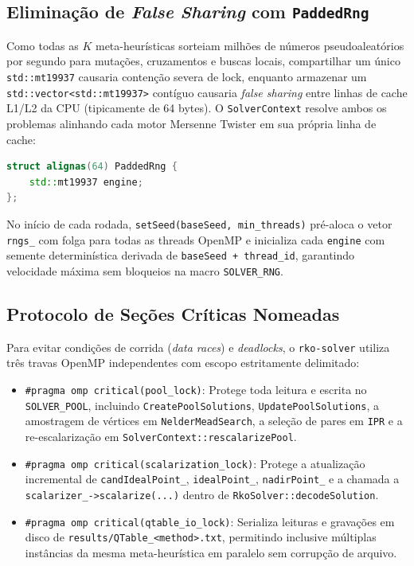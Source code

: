\documentclass[11pt,a4paper]{article}
\begin{document}
\subsection{Eliminação de \emph{False Sharing} com \texttt{PaddedRng}}

Como todas as $K$ meta-heurísticas sorteiam milhões de números pseudoaleatórios por segundo para mutações, cruzamentos e buscas locais, compartilhar um único \texttt{std::mt19937} causaria contenção severa de lock, enquanto armazenar um \texttt{std::vector<std::mt19937>} contíguo causaria \emph{false sharing} entre linhas de cache L1/L2 da CPU (tipicamente de 64 bytes). O \texttt{SolverContext} resolve ambos os problemas alinhando cada motor Mersenne Twister em sua própria linha de cache:
\begin{lstlisting}[language=C++, caption={Gerador isolado e alinhado em linha de cache de 64 bytes (\texttt{context.hpp}).}]
struct alignas(64) PaddedRng {
    std::mt19937 engine;
};
\end{lstlisting}
No início de cada rodada, \texttt{setSeed(baseSeed, min\_threads)} pré-aloca o vetor \texttt{rngs\_} com folga para todas as threads OpenMP e inicializa cada \texttt{engine} com semente determinística derivada de \texttt{baseSeed + thread\_id}, garantindo velocidade máxima sem bloqueios na macro \texttt{SOLVER\_RNG}.

\subsection{Protocolo de Seções Críticas Nomeadas}

Para evitar condições de corrida (\emph{data races}) e \emph{deadlocks}, o \texttt{rko-solver} utiliza três travas OpenMP independentes com escopo estritamente delimitado:
\begin{itemize}[leftmargin=*]
  \item \texttt{\#pragma omp critical(pool\_lock)}: Protege toda leitura e escrita no \texttt{SOLVER\_POOL}, incluindo \texttt{CreatePoolSolutions}, \texttt{UpdatePoolSolutions}, a amostragem de vértices em \texttt{NelderMeadSearch}, a seleção de pares em \texttt{IPR} e a re-escalarização em \texttt{SolverContext::rescalarizePool}.
  \item \texttt{\#pragma omp critical(scalarization\_lock)}: Protege a atualização incremental de \texttt{candIdealPoint\_}, \texttt{idealPoint\_}, \texttt{nadirPoint\_} e a chamada a \texttt{scalarizer\_->scalarize(...)} dentro de \texttt{RkoSolver::decodeSolution}.
  \item \texttt{\#pragma omp critical(qtable\_io\_lock)}: Serializa leituras e gravações em disco de \texttt{results/QTable\_<method>.txt}, permitindo inclusive múltiplas instâncias da mesma meta-heurística em paralelo sem corrupção de arquivo.
\end{itemize}
\end{document}
